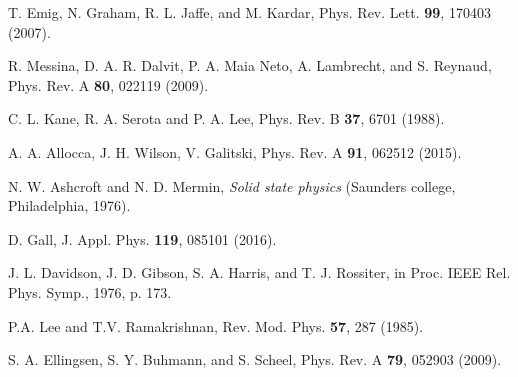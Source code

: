 \documentclass[doublecol]{epl2}
\begin{document}
\begin{thebibliography}{0}







T. Emig, N. Graham, R. L. Jaffe, and M. Kardar, Phys.
Rev. Lett. \textbf{99}, 170403 (2007).

R. Messina, D. A. R. Dalvit, P. A. Maia Neto, A. Lambrecht, and S. Reynaud, 
Phys. Rev. A \textbf{80}, 022119 (2009).

C. L. Kane, R. A. Serota and P. A. Lee,
Phys. Rev. B \textbf{37}, 6701 (1988).


A. A. Allocca, J. H. Wilson, V. Galitski,
Phys. Rev. A \textbf{91}, 062512 (2015).


N. W. Ashcroft and N. D. Mermin, \textit{Solid state physics} (Saunders college, Philadelphia, 1976).



D. Gall, J. Appl. Phys. \textbf{119}, 085101 (2016).


J. L. Davidson, J. D. Gibson, S. A. Harris, and T. J. Rossiter,
in Proc. IEEE Rel. Phys. Symp., 1976, p. 173.

P.A. Lee and T.V. Ramakrishnan,
Rev. Mod. Phys. \textbf{57}, 287 (1985).



S. A. Ellingsen, S. Y. Buhmann, and S. Scheel,
Phys. Rev. A \textbf{79}, 052903 (2009).


\end{thebibliography}
\end{document}
